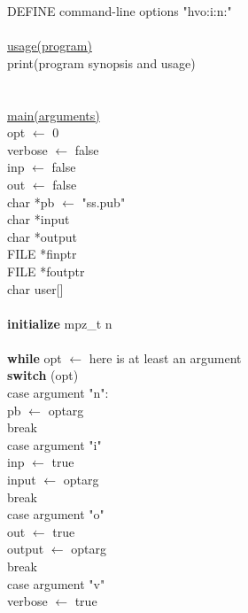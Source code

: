 \documentclass[12pt]{article}
\begin{document}
DEFINE command-line options "hvo:i:n:" \\
\\
\underline{usage(program)} \\
\indent print(program synopsis and usage) \\
\\
\\
\underline{main(arguments)} \\
\indent opt $\leftarrow$ 0 \\
\indent verbose $\leftarrow$ false \\
\indent inp $\leftarrow$ false \\
\indent out $\leftarrow$ false \\
\indent char *pb $\leftarrow$ "ss.pub" \\
\indent char *input \\
\indent char *output \\
\indent FILE *finptr \\
\indent FILE *foutptr \\
\indent char user[] \\
\\
\indent \textbf{initialize} mpz\_t n \\
\\
\indent \textbf{while} opt $\leftarrow$ here is at least an argument \\
\indent \indent \textbf{switch} (opt) \\
\indent \indent \indent case argument "n": \\
\indent \indent \indent \indent pb $\leftarrow$ optarg \\
\indent \indent \indent \indent break \\
\indent \indent \indent case argument "i" \\
\indent \indent \indent \indent inp $\leftarrow$ true \\
\indent \indent \indent \indent input $\leftarrow$ optarg \\
\indent \indent \indent \indent break \\
\indent \indent \indent case argument "o" \\
\indent \indent \indent \indent out $\leftarrow$ true \\
\indent \indent \indent \indent output $\leftarrow$ optarg \\
\indent \indent \indent \indent break \\
\indent \indent \indent case argument "v" \\
\indent \indent \indent \indent verbose $\leftarrow$ true \\
\end{document}

